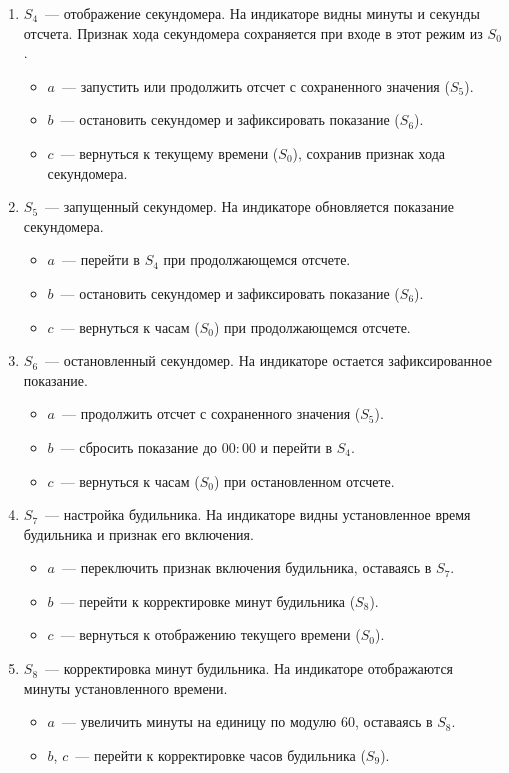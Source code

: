 \begin{enumerate}[itemsep=0.3\baselineskip]
	\item $S_4$~--- отображение секундомера. На индикаторе видны минуты и секунды отсчета. Признак хода секундомера сохраняется при входе в этот режим из $S_0$.
	\begin{itemize}
		\item $a$~--- запустить или продолжить отсчет с сохраненного значения ($S_5$).
		\item $b$~--- остановить секундомер и зафиксировать показание ($S_6$).
		\item $c$~--- вернуться к текущему времени ($S_0$), сохранив признак хода секундомера.
	\end{itemize}

	\item $S_5$~--- запущенный секундомер. На индикаторе обновляется показание секундомера.
	\begin{itemize}
		\item $a$~--- перейти в $S_4$ при продолжающемся отсчете.
		\item $b$~--- остановить секундомер и зафиксировать показание ($S_6$).
		\item $c$~--- вернуться к часам ($S_0$) при продолжающемся отсчете.
	\end{itemize}

	\newpage
	\item $S_6$~--- остановленный секундомер. На индикаторе остается зафиксированное показание.
	\begin{itemize}
		\item $a$~--- продолжить отсчет с сохраненного значения ($S_5$).
		\item $b$~--- сбросить показание до $00{:}00$ и перейти в $S_4$.
		\item $c$~--- вернуться к часам ($S_0$) при остановленном отсчете.
	\end{itemize}

	\item $S_7$~--- настройка будильника. На индикаторе видны установленное время будильника и признак его включения.
	\begin{itemize}
		\item $a$~--- переключить признак включения будильника, оставаясь в $S_7$.
		\item $b$~--- перейти к корректировке минут будильника ($S_8$).
		\item $c$~--- вернуться к отображению текущего времени ($S_0$).
	\end{itemize}

	\item $S_8$~--- корректировка минут будильника. На индикаторе отображаются минуты установленного времени.
	\begin{itemize}
		\item $a$~--- увеличить минуты на единицу по модулю $60$, оставаясь в $S_8$.
		\item $b$, $c$~--- перейти к корректировке часов будильника ($S_9$).
	\end{itemize}


\end{enumerate}
